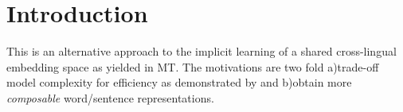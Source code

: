 \section{Introduction}\label{sec:intro}
This is an alternative approach to the implicit learning of a shared cross-lingual embedding space as yielded in MT. The motivations are two fold a)trade-off model complexity for efficiency as demonstrated by \cite{Mikolov2013} and b)obtain more \textit{composable} word/sentence representations.